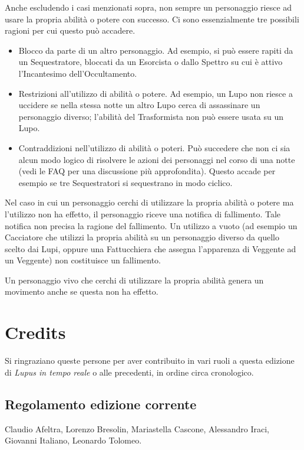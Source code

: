 \documentclass[a4paper,10pt]{article}
\begin{document}
Anche escludendo i casi menzionati sopra, non sempre un personaggio riesce ad usare la propria abilità o potere con successo. Ci sono essenzialmente tre possibili ragioni per cui questo può accadere.

\begin{itemize}
	\item Blocco da parte di un altro personaggio. Ad esempio, si può essere rapiti da un Sequestratore, bloccati da un Esorcista o dallo Spettro su cui è attivo l'Incantesimo dell'Occultamento.
	\item Restrizioni all'utilizzo di abilità o potere. Ad esempio, un Lupo non riesce a uccidere se nella stessa notte un altro Lupo cerca di assassinare un personaggio diverso; l'abilità del Trasformista non può essere usata su un Lupo.
	\item Contraddizioni nell'utilizzo di abilità o poteri. Può succedere che non ci sia alcun modo logico di risolvere le azioni dei personaggi nel corso di una notte (vedi le FAQ per una discussione più approfondita). Questo accade per esempio se tre Sequestratori si sequestrano in modo ciclico.
\end{itemize}

Nel caso in cui un personaggio cerchi di utilizzare la propria abilità o potere ma l'utilizzo non ha effetto, il personaggio riceve una notifica di fallimento. Tale notifica non precisa la ragione del fallimento. Un utilizzo a vuoto (ad esempio un Cacciatore che utilizzi la propria abilità su un personaggio diverso da quello scelto dai Lupi, oppure una Fattucchiera che assegna l'apparenza di Veggente ad un Veggente) non costituisce un fallimento.

Un personaggio vivo che cerchi di utilizzare la propria abilità genera un movimento anche se questa non ha effetto.

\section{Credits}\label{credits}

Si ringraziano queste persone per aver contribuito in vari ruoli a questa edizione di \emph{Lupus in tempo reale} o alle precedenti, in ordine circa cronologico.

\subsection*{Regolamento edizione corrente}

Claudio Afeltra, Lorenzo Bresolin, Mariastella Cascone, Alessandro Iraci, Giovanni Italiano, Leonardo Tolomeo.
\end{document}
